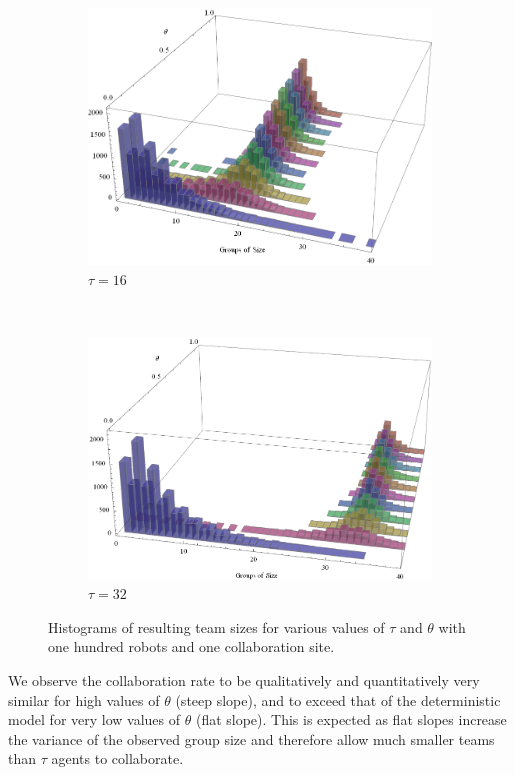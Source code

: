 \documentclass{TeXstyles/DARS/svmult}  %
\begin{document}
\begin{figure}[!htb]
\begin{subfigure}{0.5\textwidth}
\centering\includegraphics[width=1.0\textwidth]{figures/collabratesweep16.png}
\centering\caption{$\tau = 16$}\label{fig:collabsweep16}
\end{subfigure}~
\begin{subfigure}{0.5\textwidth}
\centering\includegraphics[width=1.0\textwidth]{figures/collabratesweep32.png}
\centering\caption{$\tau = 32$}\label{fig:collabsweep32}
\end{subfigure}
\caption{Histograms of resulting team sizes for various values of $\tau$ and $\theta$ with one hundred robots and one collaboration site.}\label{fig:collabsweep}
\end{figure}

We observe the collaboration rate to be qualitatively and quantitatively very similar for high values of $\theta$ (steep slope), and to exceed that of the deterministic model for very low values of $\theta$ (flat slope). This is expected as flat slopes increase the variance of the observed group size and therefore allow much smaller teams than $\tau$ agents to collaborate.
\end{document}
